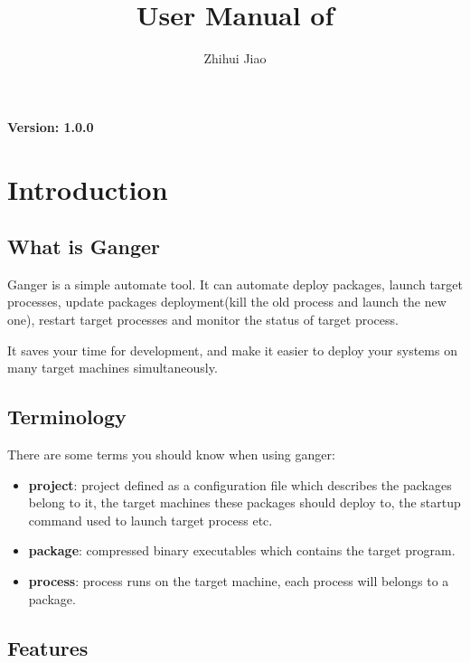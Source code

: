 \documentclass[]{article}
\title{User Manual of \softname}
\author{Zhihui Jiao}
\newcommand{\program}[1]{\textsf{#1}}
\newcommand{\softname}{Ganger }
\newcommand{\mastername}{ganger}
\newcommand{\docversion}[1]{\textbf{Version: #1}}
\begin{document}
\maketitle
\begin{center}
\docversion{1.0.0}
\end{center}
\newpage
\tableofcontents
\newpage

\section{Introduction}
\subsection{What is \softname}

\softname is a simple automate tool. It can automate deploy packages, launch target processes, update packages deployment(kill the old process and launch the new one), restart target processes and monitor the status of target process.

It saves your time for development, and make it easier to deploy your systems on many target machines simultaneously.

\subsection{Terminology}

There are some terms you should know when using \program{\mastername}:

\begin{itemize}
\item \textbf{project}: project defined as a configuration file which describes the packages belong to it, the target machines these packages should deploy to, the startup command used to launch target process etc.
\item \textbf{package}: compressed binary executables which contains the target program.
\item \textbf{process}: process runs on the target machine, each process will belongs to a package.
\end{itemize}

\subsection{Features}
\end{document}
